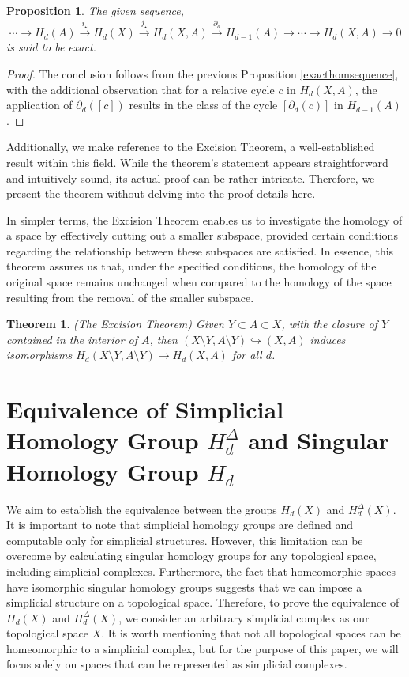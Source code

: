 \documentclass{amsart}
\newtheorem{theorem}[section]{Theorem}
\newtheorem{proposition}[definition]{Proposition}
\begin{document}
\begin{proposition}
The given sequence,
\begin{equation*}
\cdots \rightarrow H_d(A) \xrightarrow{i_\star} H_d(X) \xrightarrow{j_\star} H_d(X,A) \xrightarrow{\partial_d} H_{d-1}(A) \rightarrow \cdots \rightarrow H_d(X,A) \rightarrow 0
\end{equation*}
is said to be exact.
\end{proposition}

\begin{proof}
The conclusion follows from the previous Proposition \ref{exacthomsequence}, with the additional observation that for a relative cycle $c$ in $H_d(X,A)$, the application of $\partial_d([c])$ results in the class of the cycle $[\partial_d(c)]$ in $H_{d-1}(A)$.
\end{proof}

Additionally, we make reference to the Excision Theorem, a well-established result within this field. While the theorem's statement appears straightforward and intuitively sound, its actual proof can be rather intricate. Therefore, we present the theorem without delving into the proof details here.

In simpler terms, the Excision Theorem enables us to investigate the homology of a space by effectively \glqq cutting out\grqq{} a smaller subspace, provided certain conditions regarding the relationship between these subspaces are satisfied. In essence, this theorem assures us that, under the specified conditions, the homology of the original space remains unchanged when compared to the homology of the space resulting from the removal of the smaller subspace.

\begin{theorem}{(The Excision Theorem)}
\label{excisiontheorem}
Given $Y \subset A \subset X$, with the closure of $Y$ contained in the interior of $A$, then $(X\setminus Y, A \setminus Y) \hookrightarrow (X,A)$ induces isomorphisms $H_d(X\setminus Y, A\setminus Y) \rightarrow H_d(X,A)$ for all $d$.
\end{theorem}

\section{Equivalence of Simplicial Homology Group $H_d^\Delta$ and Singular Homology Group $H_d$}
We aim to establish the equivalence between the groups $H_d(X)$ and $H^\Delta_d(X)$. It is important to note that simplicial homology groups are defined and computable only for simplicial structures. However, this limitation can be overcome by calculating singular homology groups for any topological space, including simplicial complexes. Furthermore, the fact that homeomorphic spaces have isomorphic singular homology groups suggests that we can impose a simplicial structure on a topological space. Therefore, to prove the equivalence of $H_d(X)$ and $H^\Delta_d(X)$, we consider an arbitrary simplicial complex as our topological space $X$. It is worth mentioning that not all topological spaces can be homeomorphic to a simplicial complex, but for the purpose of this paper, we will focus solely on spaces that can be represented as simplicial complexes.
\end{document}
